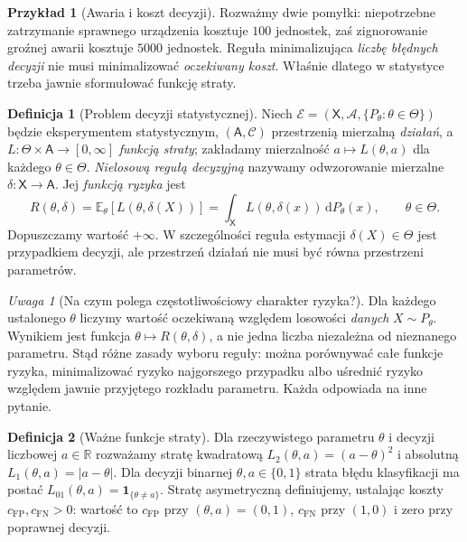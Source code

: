 \documentclass[11pt,a4paper,oneside]{report}
\numberwithin{equation}{chapter}
\theoremstyle{plain}
\theoremstyle{definition}
\newtheorem{definicja}{Definicja}[chapter]
\newtheorem{przyklad}{Przykład}[chapter]
\theoremstyle{remark}
\newtheorem{uwaga}{Uwaga}[chapter]
\newcommand{\R}{\mathbb R}
\newcommand{\E}{\mathbb E}
\newcommand{\calA}{\mathcal A}
\newcommand{\ind}[1]{\mathbf 1_{#1}}
\newcommand{\dd}{\mathrm d}
\begin{document}
\begin{przyklad}[Awaria i koszt decyzji]
Rozważmy dwie pomyłki: niepotrzebne zatrzymanie sprawnego urządzenia
kosztuje $100$ jednostek, zaś zignorowanie groźnej awarii kosztuje
$5000$ jednostek. Reguła minimalizująca \emph{liczbę błędnych decyzji}
nie musi minimalizować \emph{oczekiwany koszt}. Właśnie dlatego
w statystyce trzeba jawnie sformułować funkcję straty.
\end{przyklad}

\begin{definicja}[Problem decyzji statystycznej]\label{def:decision-problem}
Niech $\mathcal E=(\mathsf X,\calA,\{P_\theta:\theta\in\Theta\})$ będzie
eksperymentem statystycznym, $(\mathsf A,\mathcal C)$ przestrzenią
mierzalną \emph{działań}, a $L:\Theta\times\mathsf A\to[0,\infty]$
\emph{funkcją straty}; zakładamy mierzalność $a\mapsto L(\theta,a)$
dla każdego $\theta\in\Theta$. \emph{Nielosową regułą decyzyjną}
nazywamy odwzorowanie mierzalne $\delta:\mathsf X\to\mathsf A$.
Jej \emph{funkcją ryzyka} jest
\[
R(\theta,\delta)
=\E_\theta[L(\theta,\delta(X))]
=\int_{\mathsf X}L(\theta,\delta(x))\,\dd P_\theta(x),
\qquad\theta\in\Theta.
\]
Dopuszczamy wartość $+\infty$. W szczególności reguła estymacji
$\delta(X)\in\Theta$ jest przypadkiem decyzji, ale przestrzeń działań
nie musi być równa przestrzeni parametrów.
\end{definicja}

\begin{uwaga}[Na czym polega częstotliwościowy charakter ryzyka?]
Dla każdego ustalonego $\theta$ liczymy wartość oczekiwaną względem
losowości \emph{danych} $X\sim P_\theta$. Wynikiem jest funkcja
$\theta\mapsto R(\theta,\delta)$, a nie jedna liczba niezależna od
nieznanego parametru. Stąd różne zasady wyboru reguły: można
porównywać całe funkcje ryzyka, minimalizować ryzyko najgorszego
przypadku albo uśrednić ryzyko względem jawnie przyjętego rozkładu
parametru. Każda odpowiada na inne pytanie.
\end{uwaga}

\begin{definicja}[Ważne funkcje straty]
Dla rzeczywistego parametru $\theta$ i decyzji liczbowej $a\in\R$
rozważamy stratę kwadratową $L_2(\theta,a)=(a-\theta)^2$ i absolutną
$L_1(\theta,a)=|a-\theta|$. Dla decyzji binarnej
$\theta,a\in\{0,1\}$ strata błędu klasyfikacji ma postać
$L_{01}(\theta,a)=\ind{\{\theta\ne a\}}$.
Stratę asymetryczną definiujemy, ustalając koszty
$c_{\mathrm{FP}},c_{\mathrm{FN}}>0$: wartość to
$c_{\mathrm{FP}}$ przy $(\theta,a)=(0,1)$,
$c_{\mathrm{FN}}$ przy $(1,0)$ i zero przy poprawnej decyzji.
\end{definicja}
\end{document}
